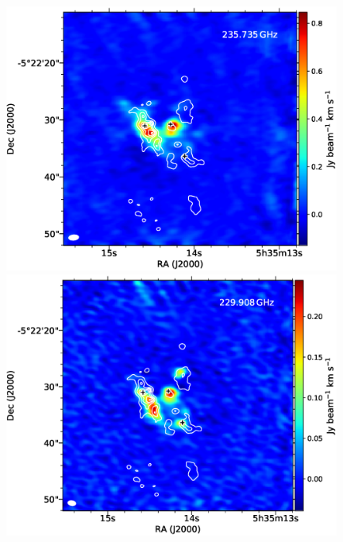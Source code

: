 \begin{figure}[H]
\begin{center}
\begin{minipage}{0.98\textwidth} 
\begin{center}
\begin{minipage}{0.48\textwidth}
\begin{center}
\includegraphics[width=0.98\textwidth]{OrionKL/mom0/235.735mom0_3-7.eps}
\end{center}
\end{minipage}
\begin{minipage}{0.48\textwidth}
\begin{center}
\includegraphics[width=0.98\textwidth]{OrionKL/mom0/229.908mom0_3-7.eps}
\end{center}
\end{minipage}
\end{center}
\end{minipage}


\end{center}
\end{figure}
